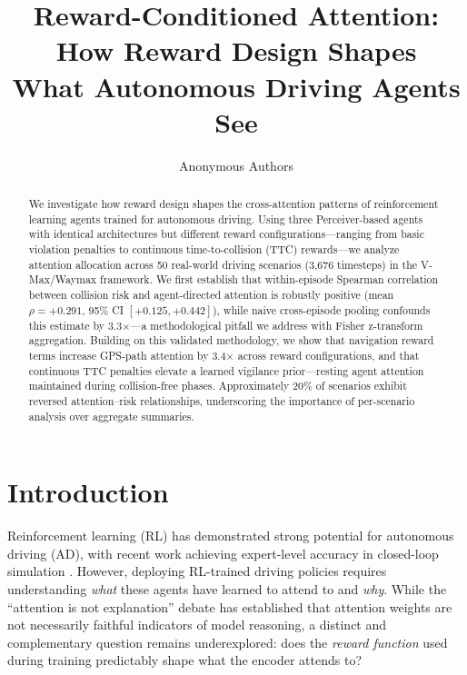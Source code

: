 \documentclass[10pt]{article} %
\title{Reward-Conditioned Attention: How Reward Design Shapes\\What Autonomous Driving Agents See}
\author{Anonymous Authors}
\begin{document}
\makeCover
\maketitle

\begin{abstract}
We investigate how reward design shapes the cross-attention patterns of reinforcement learning agents trained for autonomous driving. Using three Perceiver-based agents with identical architectures but different reward configurations---ranging from basic violation penalties to continuous time-to-collision (TTC) rewards---we analyze attention allocation across 50 real-world driving scenarios (3,676 timesteps) in the V-Max/Waymax framework. We first establish that within-episode Spearman correlation between collision risk and agent-directed attention is robustly positive (mean $\rho{=}+0.291$, 95\% CI $[+0.125, +0.442]$), while naive cross-episode pooling confounds this estimate by 3.3$\times$---a methodological pitfall we address with Fisher z-transform aggregation. Building on this validated methodology, we show that navigation reward terms increase GPS-path attention by 3.4$\times$ across reward configurations, and that continuous TTC penalties elevate a learned vigilance prior---resting agent attention maintained during collision-free phases. Approximately 20\% of scenarios exhibit reversed attention--risk relationships, underscoring the importance of per-scenario analysis over aggregate summaries.
\end{abstract}


\section{Introduction}
\label{sec:intro}

Reinforcement learning (RL) has demonstrated strong potential for autonomous driving (AD), with recent work achieving expert-level accuracy in closed-loop simulation \citep{charraut2025vmax, cusumano2025robust}. However, deploying RL-trained driving policies requires understanding \textit{what} these agents have learned to attend to and \textit{why}. While the ``attention is not explanation'' debate \citep{jain2019attention, wiegreffe2019attention} has established that attention weights are not necessarily faithful indicators of model reasoning, a distinct and complementary question remains underexplored: does the \textit{reward function} used during training predictably shape what the encoder attends to?
\end{document}
